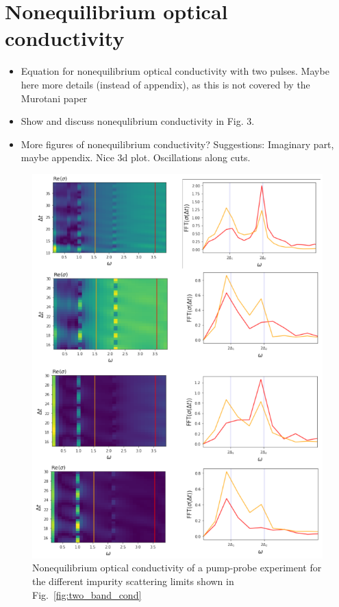 \documentclass[aps,prb,reprint,noeprint,superscriptaddress]{revtex4-2}
\begin{document}
\section{Nonequilibrium optical conductivity}
\label{sec:noneq_cond}

\begin{itemize}
	\item Equation for nonequilibrium optical conductivity with two pulses. Maybe here more details (instead of appendix), as this is not covered by the Murotani paper
	\item Show and discuss nonequlibrium conductivity in Fig. 3.
	\item More figures of nonequilibrium conductivity? Suggestions: Imaginary part, maybe appendix. Nice 3d plot. Oscillations along cuts.
\end{itemize}


\begin{figure}[H]
    \centering
    \includegraphics[width=\columnwidth]{figures/noneq_cond.png}
    \caption{\label{fig:noneq_cond}%
    Nonequilibrium optical conductivity of a pump-probe experiment for the different impurity scattering limits shown in Fig.~\ref{fig:two_band_cond}}
\end{figure}%
\end{document}
